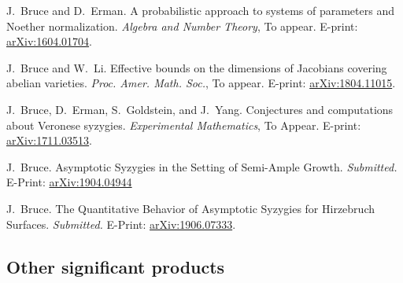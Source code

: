 \documentclass[svgnames,11pt]{article}
\begin{document}
\begin{bibenum}[itemsep=5pt]

    \item
	J.~Bruce and D.~Erman. A probabilistic approach to systems of parameters and Noether normalization. {\it Algebra and Number Theory}, To appear. E-print: \hyperref{http://arxiv.org/abs/1604.01704}{}{}{arXiv:1604.01704}.
	
\item
	J.~Bruce and W.~Li. Effective bounds on the dimensions of Jacobians covering abelian varieties.  {\it Proc. Amer. Math. Soc.}, To appear. E-print: \hyperref{https://arxiv.org/abs/1804.11015}{}{}{arXiv:1804.11015}.
			
\item
	J.~Bruce, D.~Erman, S.~Goldstein, and J.~Yang. Conjectures and computations about Veronese syzygies.  {\it Experimental Mathematics}, To Appear. E-print: \hyperref{https://arxiv.org/abs/1711.03513}{}{}{arXiv:1711.03513}.

\item
	J.~Bruce. Asymptotic Syzygies in the Setting of Semi-Ample Growth. {\it Submitted.}\\ E-Print:  \hyperref{https://arxiv.org/abs/1904.04944}{}{}{arXiv:1904.04944}

\item
	J.~Bruce. The Quantitative Behavior of Asymptotic Syzygies for Hirzebruch Surfaces. {\it Submitted.} E-Print:  \hyperref{http://arxiv.org/abs/1906.07333}{}{}{arXiv:1906.07333}.
	
	
\end{bibenum}

\subsection{Other significant products}
\end{document}
